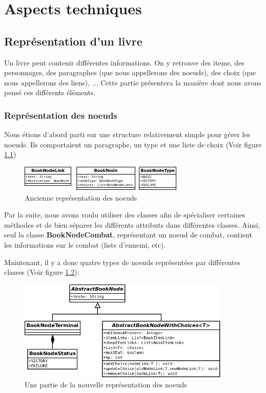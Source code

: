 \chapter{Aspects techniques}

	\section{Représentation d'un livre}
		Un livre peut contenir différentes informations. On y retrouve des items, des personnages, des paragraphes (que nous appellerons des noeuds), des choix (que nous appellerons des liens), ... Cette partie présentera la manière dont nous avons pensé ces différents éléments.

		\subsection{Représentation des noeuds}

			Nous étions d'abord parti sur une structure relativement simple pour gérer les noeuds. Ils comportaient un paragraphe, un type et une liste de choix (Voir figure \ref{fig:OldBookNode})

			\begin{figure}[H]
				\centering\includegraphics[width=0.70\textwidth, keepaspectratio]{img/BookNodeBefore.png}
				\caption{Ancienne représentation des noeuds}
				\label{fig:OldBookNode}
			\end{figure}

			Par la suite, nous avons voulu utiliser des classes afin de spécialiser certaines méthodes et de bien séparer les différents attributs dans différentes classes. Ainsi, seul la classe \textbf{BookNodeCombat}, représentant un noeud de combat, contient les informations sur le combat (liste d'ennemi, etc).

			Maintenant, il y a donc quatre types de noeuds représentées par différentes classes (Voir figure \ref{fig:BookNode}):

			\begin{figure}[H]
				\centering\includegraphics[width=0.90\textwidth, keepaspectratio]{img/BookNode1.png}
				\caption{Une partie de la nouvelle représentation des noeuds}
				\label{fig:BookNode}
			\end{figure}

